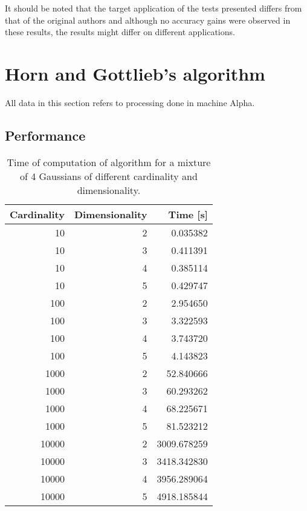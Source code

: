 It should be noted that the target application of the tests presented differs from that of the original authors and although no accuracy gains were observed in these results, the results might differ on different applications.

\section{Horn and Gottlieb's algorithm}



All data in this section refers to processing done in machine Alpha.

\subsection{Performance}

\begin{table}[h]
\centering
\caption{Time of computation of \citet{Horn2001b} algorithm for a mixture of 4 Gaussians of different cardinality and dimensionality.}

\begin{tabular}{rrr}
\toprule
 Cardinality &  Dimensionality &     Time [s] \\
\midrule
          10 &               2 &     0.035382 \\
          10 &               3 &     0.411391 \\
          10 &               4 &     0.385114 \\
          10 &               5 &     0.429747 \\
         100 &               2 &     2.954650 \\
         100 &               3 &     3.322593 \\
         100 &               4 &     3.743720 \\
         100 &               5 &     4.143823 \\
        1000 &               2 &    52.840666 \\
        1000 &               3 &    60.293262 \\
        1000 &               4 &    68.225671 \\
        1000 &               5 &    81.523212 \\
       10000 &               2 &  3009.678259 \\
       10000 &               3 &  3418.342830 \\
       10000 &               4 &  3956.289064 \\
       10000 &               5 &  4918.185844 \\
\bottomrule
\end{tabular}

\label{tab:horn performance}
\end{table}




